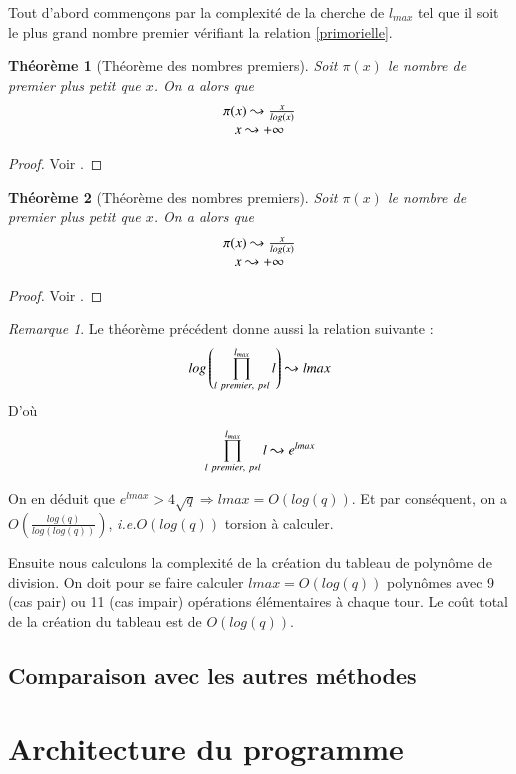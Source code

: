\documentclass{article}%
\theoremstyle{plain}
\newtheorem{theoreme}{Théorème}[section]
\theoremstyle{definition}
\theoremstyle{plain}
\theoremstyle{plain}
\theoremstyle{remark}
\newtheorem*{remarque}{Remarque}
\newcommand\ie{\textit{i.e.}}
\begin{document}
Tout d'abord commençons par la complexité de la cherche de $l_{max}$ tel que il soit le plus grand nombre premier vérifiant la relation \eqref{primorielle}.

\begin{theoreme}[Théorème des nombres premiers]
Soit $\pi(x)$ le nombre de premier plus petit que $x$. On a alors que $$
\begin{array}{cl cl}
\pi(x)\leadsto\frac{x}{log(x)}\\
x \leadsto +\infty 
\end{array}$$
\end{theoreme}
\begin{proof}
Voir \cite{ref5}.
\end{proof}
\begin{theoreme}[Théorème des nombres premiers]
Soit $\pi(x)$ le nombre de premier plus petit que $x$. On a alors que $$
\begin{array}{cl cl}
\pi(x)\leadsto\frac{x}{log(x)}\\
x \leadsto +\infty 
\end{array}$$
\end{theoreme}
\begin{proof}
Voir \cite{ref5}.
\end{proof}
\begin{remarque}
Le théorème précédent donne aussi la relation suivante :
$$log\left(\prod_{l\ premier,\ p\nshortmid l}^{l_{max}}l\right) \leadsto lmax$$
D'où $$\prod_{l\ premier,\ p\nshortmid l}^{l_{max}}l\leadsto e^{lmax}$$  
\end{remarque}
On en déduit que $e^{lmax}>4\sqrt{q} \Rightarrow lmax = O(log(q))$. Et par conséquent, on a $O\left(\frac{log(q)}{log(log(q))}\right)$, \ie $O(log(q))$ torsion à calculer.


Ensuite nous calculons la complexité de la création du tableau de polynôme de division.
On doit pour se faire calculer $lmax = O(log(q))$ polynômes avec 9 (cas pair) ou 11 (cas impair) opérations élémentaires à chaque tour. Le coût total de la création du tableau est de $O(log(q))$.

 


\subsection{Comparaison avec les autres méthodes}

\section{Architecture du programme}
\end{document}
